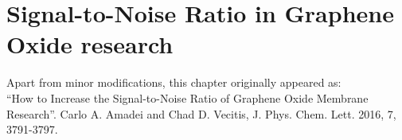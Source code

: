 \chapter{Signal-to-Noise Ratio in Graphene Oxide research}
\thispagestyle{plain}
\vspace{-.5cm}

\noindent Apart from minor modifications, this chapter originally appeared as:\newline\\
\ssp ``How to Increase the Signal-to-Noise Ratio of Graphene Oxide Membrane Research''.
Carlo A. Amadei and Chad D. Vecitis, J. Phys. Chem. Lett. 2016, 7, 3791-3797.


    \dsp
    


